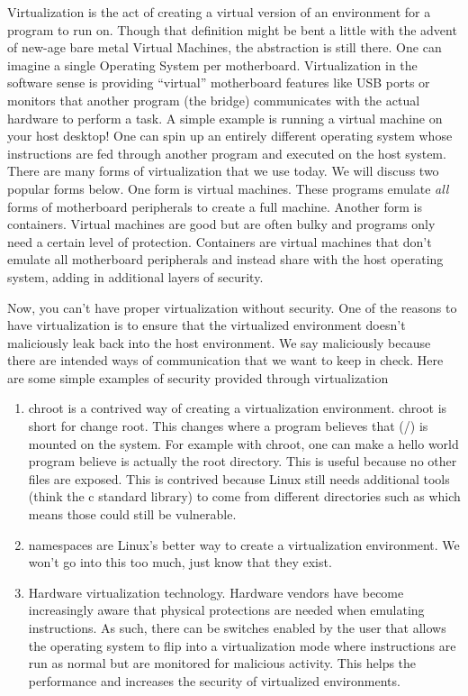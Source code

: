 Virtualization is the act of creating a virtual version of an environment for a program to run on.
Though that definition might be bent a little with the advent of new-age bare metal Virtual Machines, the abstraction is still there.
One can imagine a single Operating System per motherboard.
Virtualization in the software sense is providing ``virtual'' motherboard features like USB ports or monitors that another program (the bridge) communicates with the actual hardware to perform a task.
A simple example is running a virtual machine on your host desktop!
One can spin up an entirely different operating system whose instructions are fed through another program and executed on the host system.
There are many forms of virtualization that we use today. We will discuss two popular forms below.
One form is virtual machines.
These programs emulate \textit{all} forms of motherboard peripherals to create a full machine.
Another form is containers.
Virtual machines are good but are often bulky and programs only need a certain level of protection.
Containers are virtual machines that don't emulate all motherboard peripherals and instead share with the host operating system, adding in additional layers of security.

Now, you can't have proper virtualization without security.
One of the reasons to have virtualization is to ensure that the virtualized environment doesn't maliciously leak back into the host environment.
We say maliciously because there are intended ways of communication that we want to keep in check.
Here are some simple examples of security provided through virtualization

\begin{enumerate}
\item chroot is a contrived way of creating a virtualization environment.
  chroot is short for change root.
  This changes where a program believes that (/) is mounted on the system.
  For example with chroot, one can make a hello world program believe  is actually the root directory.
  This is useful because no other files are exposed.
  This is contrived because Linux still needs additional tools (think the c standard library) to come from different directories such as  which means those could still be vulnerable.
\item namespaces are Linux's better way to create a virtualization environment.
  We won't go into this too much, just know that they exist.
\item Hardware virtualization technology.
  Hardware vendors have become increasingly aware that physical protections are needed when emulating instructions.
  As such, there can be switches enabled by the user that allows the operating system to flip into a virtualization mode where instructions are run as normal but are monitored for malicious activity.
  This helps the performance and increases the security of virtualized environments.
\end{enumerate}

